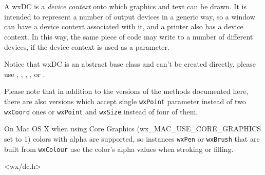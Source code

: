 \section{}\label{wxdc}

A wxDC is a {\it device context} onto which graphics and text can be drawn.
It is intended to represent a number of output devices in a generic way,
so a window can have a device context associated with it, and a printer also has a device context.
In this way, the same piece of code may write to a number of different devices,
if the device context is used as a parameter.

Notice that wxDC is an abstract base class and can't be created directly,
please use , , 
, , 
 or .

Please note that in addition to the versions of the methods documented here,
there are also versions which accept single {\tt wxPoint} parameter instead of
two {\tt wxCoord} ones or {\tt wxPoint} and {\tt wxSize} instead of four of
them.


On Mac OS X when using Core Graphics (wx\_MAC\_USE\_CORE\_GRAPHICS set to 1) 
colors with alpha are supported, so instances  {\tt wxPen} or  {\tt wxBrush} that are built from  {\tt wxColour} use
the color's alpha values when stroking or filling.




<wx/dc.h>





\label{wxdcblit}


